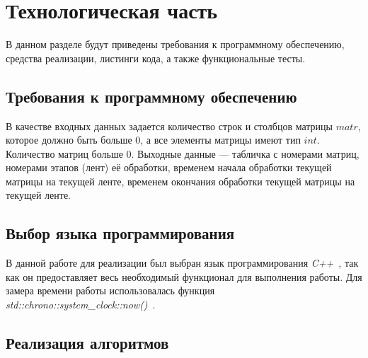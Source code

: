 \chapter{Технологическая часть}

В данном разделе будут приведены требования к программному обеспечению, средства реализации, листинги кода, а также функциональные тесты.

\section{Требования к программному обеспечению}

В качестве входных данных задается количество строк и столбцов матрицы $matr$, которое должно быть больше 0, а все элементы матрицы имеют тип $int$. Количество матриц больше 0.
Выходные данные --- табличка с номерами матриц, номерами этапов (лент) её обработки, временем начала обработки текущей матрицы на текущей ленте, временем окончания обработки текущей матрицы на текущей ленте.

\section{Выбор языка программирования}

В данной работе для реализации был выбран язык программирования \textit{C++}~\cite{bib2}, так как он предоставляет весь необходимый функционал для выполнения работы. Для замера времени работы использовалась функция \textit{std::chrono::system\_clock::now()}~\cite{bib3}.

\section{Реализация алгоритмов}

